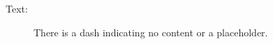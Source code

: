 

\item[b)] 
    \begin{description}
        \item[Text:] There is a dash indicating no content or a placeholder.
    \end{description}